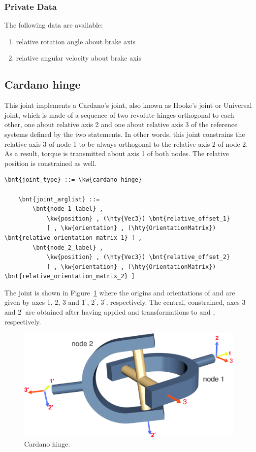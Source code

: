 \subsubsection{Private Data}
The following data are available:
\begin{enumerate}
\item {} relative rotation angle about brake axis
\item {} relative angular velocity about brake axis
\end{enumerate}




\subsection{Cardano hinge}
\label{sec:EL:STRUCT:JOINT:CARDANO_HINGE}
This joint implements a Cardano's joint, also known as Hooke's joint
or Universal joint, which is made of a sequence
of two revolute hinges orthogonal to each other, one about relative axis 2
and one about relative axis 3 of the reference systems
defined by the two  %
statements.
In other words, this joint constrains the relative axis 3 of node 1 
to be always orthogonal to the relative axis 2 of node 2.
As a result, torque is transmitted about axis 1 of both nodes.
The relative position is constrained as well.
\begin{Verbatim}[commandchars=\\\{\}]
    \bnt{joint_type} ::= \kw{cardano hinge}

    \bnt{joint_arglist} ::= 
        \bnt{node_1_label} ,
            \kw{position} , (\hty{Vec3}) \bnt{relative_offset_1}
            [ , \kw{orientation} , (\hty{OrientationMatrix}) \bnt{relative_orientation_matrix_1} ] ,
        \bnt{node_2_label} ,
            \kw{position} , (\hty{Vec3}) \bnt{relative_offset_2}
            [ , \kw{orientation} , (\hty{OrientationMatrix}) \bnt{relative_orientation_matrix_2} ]
\end{Verbatim}
The joint is shown in Figure~\ref{fig:el:joint:CARDANO} where the origins and orientations of  and  are given by axes 1, 2, 3 and 1$^\prime$, 2$^\prime$, 3$^\prime$, respectively. The central, constrained, axes 3 and 2$^\prime$ are obtained after having applied  and  transformations to  and , respectively.
\begin{figure}
\centering
\includegraphics[width=.5\textwidth]{cardano}
\caption{Cardano hinge.}
\label{fig:el:joint:CARDANO}
\end{figure}
